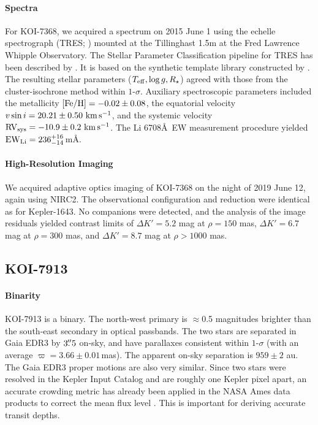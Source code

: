 \documentclass[12pt,twocolumn]{aastex63}
\newcommand{\mkms}{{\rm \,km\,s^{-1}}}  %
\begin{document}
\paragraph{Spectra}
For KOI-7368, we acquired a spectrum on 2015 June 1 using the echelle
spectrograph (TRES; \citealt{furesz_tres_2008}) mounted at the
Tillinghast 1.5m at the Fred Lawrence Whipple Observatory.  The
Stellar Parameter Classification pipeline for TRES has been described
by \citet{2021tsc2.confE.124B}.  It is based on the synthetic template
library constructed by \citet{Buchhave2012}.  The resulting stellar
parameters ($T_{\rm eff}, \log g, R_\star$) agreed with those from the
cluster-isochrone method within $1$-$\sigma$.  Auxiliary
spectroscopic parameters included the metallicity $[{\rm Fe/H}]= -0.02
\pm 0.08$, the equatorial velocity $v\sin i = 20.21 \pm 0.50\,\mkms$,
and the systemic velocity ${\rm RV}_{\rm sys} = -10.9 \pm 0.2\,\mkms$.
The Li 6708\AA\ EW measurement procedure yielded ${\rm EW}_{\rm Li} =
236^{+16}_{-14}$\,m\AA.

\paragraph{High-Resolution Imaging}
We acquired adaptive optics imaging of KOI-7368 on the night of 2019
June 12, again using NIRC2.  The observational configuration and
reduction were identical as for Kepler-1643.  No companions were
detected, and the analysis of the image residuals yielded contrast
limits of $\Delta K' = 5.2$ mag at $\rho = 150$ mas, $\Delta K' = 6.7$
mag at $\rho = 300$ mas, and $\Delta K' = 8.7$ mag at $\rho > 1000$
mas.

\subsection{KOI-7913}

\paragraph{Binarity}
KOI-7913 is a binary.  The north-west primary is
$\approx$0.5 magnitudes brighter than the south-east secondary in
optical passbands.  The two stars are separated in Gaia EDR3 by
$3\mbox{$.\!\!^{\prime\prime}$}5$ on-sky, and have parallaxes consistent within $1$-$\sigma$
(with an average $\varpi=3.66 \pm 0.01$\,mas).  The apparent on-sky
separation is $959 \pm 2$ au.  The Gaia EDR3 proper motions are also
very similar.  Since two stars were resolved in the Kepler Input
Catalog and are roughly one Kepler pixel apart, an accurate crowding
metric has already been applied in the NASA Ames data products to
correct the mean flux level \citep{2017ksci.rept....6M}.  This is
important for deriving accurate transit depths.
\end{document}
